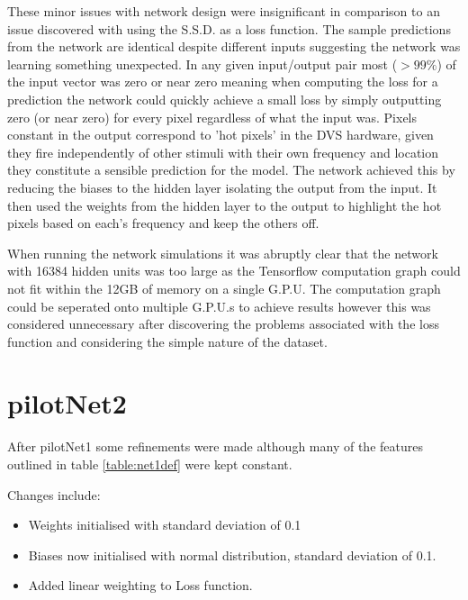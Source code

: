 These minor issues with network design were insignificant in comparison to an issue discovered with using the S.S.D. as a loss function. 
The sample predictions from the network are identical despite different inputs suggesting the network was learning something unexpected.
In any given input/output pair most ($>99\%$) of the input vector was zero or near zero meaning when computing the loss for a prediction the network could quickly achieve a small loss by simply outputting zero (or near zero) for every pixel regardless of what the input was. 
Pixels constant in the output correspond to 'hot pixels' in the DVS hardware, given they fire independently of other stimuli with their own frequency and location they constitute a sensible prediction for the model. 
The network achieved this by reducing the biases to the hidden layer isolating the output from the input.
It then used the weights from the hidden layer to the output to highlight the hot pixels based on each's frequency and keep the others off. 


When running the network simulations it was abruptly clear that the network with 16384 hidden units was too large as the Tensorflow computation graph could not fit within the 12GB of memory on a single G.P.U.
The computation graph could be seperated onto multiple G.P.U.s to achieve results however this was considered unnecessary after discovering the problems associated with the loss function and considering the simple nature of the dataset.




\section{pilotNet2}
After pilotNet1 some refinements were made although many of the features outlined in table \ref{table:net1def} were kept constant. 

Changes include:
\begin{itemize}
    \itemsep-0.5em
    \item Weights initialised with standard deviation of 0.1
    \item Biases now initialised with normal distribution, standard deviation of 0.1.
    \item Added linear weighting to Loss function.
\end{itemize}

